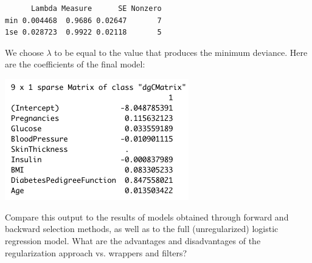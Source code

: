\begin{question}{}
\begin{center}
{\begin{verbatim}
      Lambda Measure      SE Nonzero
min 0.004468  0.9686 0.02647       7
1se 0.028723  0.9922 0.02118       5
\end{verbatim}
}
\end{center}
We choose $\lambda$ to be equal to the value that produces the minimum deviance. Here are the coefficients of the final model:
\begin{center}
\includegraphics[width=0.6\textwidth]{img/pima-glmnet-output.png}
\end{center}
Compare this output to the results of models obtained through forward and backward selection methods, as well as to the full (unregularized) logistic regression model. What are the advantages and disadvantages of the regularization approach vs. wrappers and filters?
\end{question}
